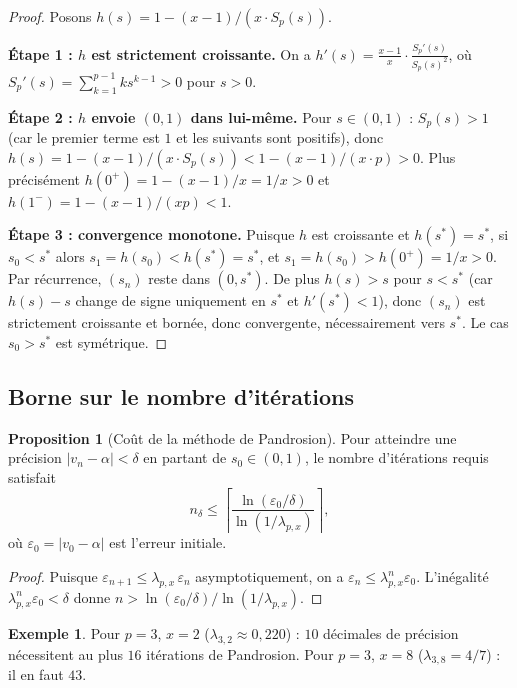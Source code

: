 \documentclass[11pt,a4paper]{article}
\theoremstyle{definition}
\newtheorem{proposition}{Proposition}[section]
\newtheorem{example}{Exemple}[section]
\newcommand{\eps}{\varepsilon}
\begin{document}
\begin{proof}
Posons $h(s) = 1 - (x-1)/(x \cdot S_p(s))$.

\textbf{Étape 1 : $h$ est strictement croissante.}
On a $h'(s) = \frac{x-1}{x} \cdot \frac{S_p'(s)}{S_p(s)^2}$, où $S_p'(s) = \sum_{k=1}^{p-1} k s^{k-1} > 0$ pour $s > 0$.

\textbf{Étape 2 : $h$ envoie $(0,1)$ dans lui-même.}
Pour $s \in (0,1)$ : $S_p(s) > 1$ (car le premier terme est $1$ et les suivants sont positifs), donc $h(s) = 1 - (x-1)/(x \cdot S_p(s)) < 1 - (x-1)/(x \cdot p) > 0$. Plus précisément $h(0^+) = 1 - (x-1)/x = 1/x > 0$ et $h(1^-) = 1 - (x-1)/(xp) < 1$.

\textbf{Étape 3 : convergence monotone.}
Puisque $h$ est croissante et $h(s^*) = s^*$, si $s_0 < s^*$ alors $s_1 = h(s_0) < h(s^*) = s^*$, et $s_1 = h(s_0) > h(0^+) = 1/x > 0$. Par récurrence, $(s_n)$ reste dans $(0, s^*)$. De plus $h(s) > s$ pour $s < s^*$ (car $h(s) - s$ change de signe uniquement en $s^*$ et $h'(s^*) < 1$), donc $(s_n)$ est strictement croissante et bornée, donc convergente, nécessairement vers $s^*$. Le cas $s_0 > s^*$ est symétrique.
\end{proof}

\subsection{Borne sur le nombre d'itérations}

\begin{proposition}[Co\^ut de la méthode de Pandrosion]
\label{prop:cout}
Pour atteindre une précision $|v_n - \alpha| < \delta$ en partant de $s_0 \in (0,1)$, le nombre d'itérations requis satisfait
\[
  n_\delta \leq \left\lceil \frac{\ln(\eps_0 / \delta)}{\ln(1/\lambda_{p,x})} \right\rceil,
\]
où $\eps_0 = |v_0 - \alpha|$ est l'erreur initiale.
\end{proposition}

\begin{proof}
Puisque $\eps_{n+1} \leq \lambda_{p,x}\,\eps_n$ asymptotiquement, on a $\eps_n \leq \lambda_{p,x}^n \eps_0$. L'inégalité $\lambda_{p,x}^n \eps_0 < \delta$ donne $n > \ln(\eps_0/\delta)/\ln(1/\lambda_{p,x})$.
\end{proof}

\begin{example}
Pour $p=3$, $x=2$ ($\lambda_{3,2} \approx 0{,}220$) : $10$ décimales de précision nécessitent au plus $16$ itérations de Pandrosion. Pour $p=3$, $x=8$ ($\lambda_{3,8} = 4/7$) : il en faut $43$.
\end{example}
\end{document}
